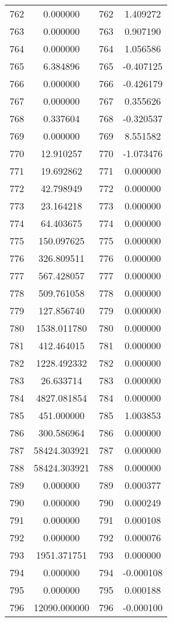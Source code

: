 \documentclass[12pt]{article}
\begin{document}
\begin{longtable}{@{}cccc@{}}
762 & 0.000000 & 762 & 1.409272 \\
763 & 0.000000 & 763 & 0.907190 \\
764 & 0.000000 & 764 & 1.056586 \\
765 & 6.384896 & 765 & -0.407125 \\
766 & 0.000000 & 766 & -0.426179 \\
767 & 0.000000 & 767 & 0.355626 \\
768 & 0.337604 & 768 & -0.320537 \\
769 & 0.000000 & 769 & 8.551582 \\
770 & 12.910257 & 770 & -1.073476 \\
771 & 19.692862 & 771 & 0.000000 \\
772 & 42.798949 & 772 & 0.000000 \\
773 & 23.164218 & 773 & 0.000000 \\
774 & 64.403675 & 774 & 0.000000 \\
775 & 150.097625 & 775 & 0.000000 \\
776 & 326.809511 & 776 & 0.000000 \\
777 & 567.428057 & 777 & 0.000000 \\
778 & 509.761058 & 778 & 0.000000 \\
779 & 127.856740 & 779 & 0.000000 \\
780 & 1538.011780 & 780 & 0.000000 \\
781 & 412.464015 & 781 & 0.000000 \\
782 & 1228.492332 & 782 & 0.000000 \\
783 & 26.633714 & 783 & 0.000000 \\
784 & 4827.081854 & 784 & 0.000000 \\
785 & 451.000000 & 785 & 1.003853 \\
786 & 300.586964 & 786 & 0.000000 \\
787 & 58424.303921 & 787 & 0.000000 \\
788 & 58424.303921 & 788 & 0.000000 \\
789 & 0.000000 & 789 & 0.000377 \\
790 & 0.000000 & 790 & 0.000249 \\
791 & 0.000000 & 791 & 0.000108 \\
792 & 0.000000 & 792 & 0.000076 \\
793 & 1951.371751 & 793 & 0.000000 \\
794 & 0.000000 & 794 & -0.000108 \\
795 & 0.000000 & 795 & 0.000188 \\
796 & 12090.000000 & 796 & -0.000100 \\

\end{longtable}
\end{document}
